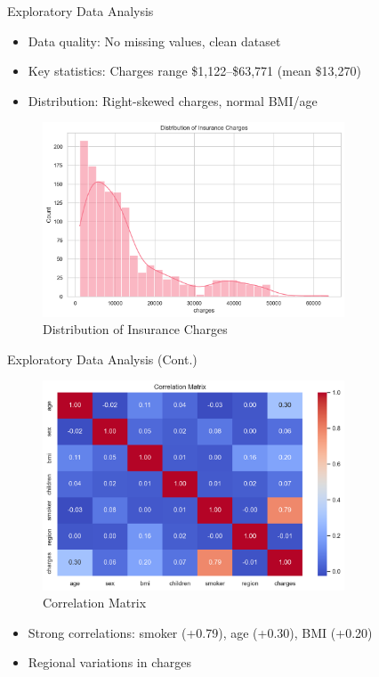 \documentclass[10pt]{beamer}
\begin{document}
\begin{frame}{Exploratory Data Analysis}
\begin{itemize}
\item Data quality: No missing values, clean dataset
\item Key statistics: Charges range \$1,122--\$63,771 (mean \$13,270)
\item Distribution: Right-skewed charges, normal BMI/age
\end{itemize}
\begin{figure}
\includegraphics[width=0.8\textwidth]{charges_dist.png}
\caption{Distribution of Insurance Charges}
\end{figure}
\end{frame}

\begin{frame}{Exploratory Data Analysis (Cont.)}
\begin{figure}
\includegraphics[width=0.8\textwidth]{correlation_heatmap.png}
\caption{Correlation Matrix}
\end{figure}
\begin{itemize}
\item Strong correlations: smoker (+0.79), age (+0.30), BMI (+0.20)
\item Regional variations in charges
\end{itemize}
\end{frame}
\end{document}
